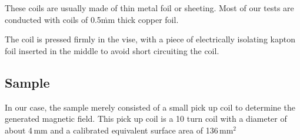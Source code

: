 These coils are usually made of thin metal foil or sheeting. Most of our 
tests are conducted with coils of 0.5\.mm thick copper foil.

The coil is pressed firmly in the vise, with a piece of electrically 
isolating kapton foil inserted in the middle to avoid short circuiting the 
coil.

\subsection{Sample}
In our case, the sample merely consisted of a small pick up coil to 
determine the generated magnetic field. This pick up coil is a 10 turn coil 
with a diameter of about 4\,mm and a calibrated equivalent surface area of 
136\,mm$^2$
